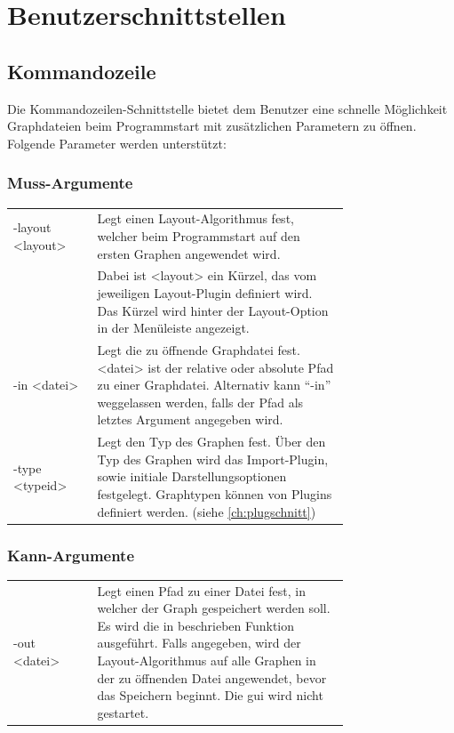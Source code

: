 \chapter{Benutzerschnittstellen}

\section{Kommandozeile}\label{sec:uicmd}

Die Kommandozeilen-Schnittstelle bietet dem Benutzer eine schnelle Möglichkeit Graphdateien beim Programmstart mit zusätzlichen Parametern zu öffnen.
Folgende Parameter werden unterstützt:\\
\subsection{Muss-Argumente}
\begin{tabular}{lp{0.75\linewidth}}
  -layout <layout> & Legt einen Layout-Algorithmus fest, welcher beim Programmstart auf den ersten Graphen angewendet wird.\\
    & Dabei ist <layout> ein Kürzel, das vom jeweiligen Layout-Plugin definiert wird. Das Kürzel wird hinter der Layout-Option in der Menüleiste angezeigt.\\
  -in <datei> & Legt die zu öffnende Graphdatei fest. <datei> ist der relative oder absolute Pfad zu einer Graphdatei. Alternativ kann ``-in'' weggelassen werden, falls der Pfad als letztes Argument angegeben wird.\\
  -type <typeid> & Legt den Typ des Graphen fest. Über den Typ des Graphen wird das Import-Plugin, sowie initiale Darstellungsoptionen festgelegt. Graphtypen können von Plugins definiert werden. (siehe \autoref{ch:plugschnitt})
\end{tabular}

\subsection{Kann-Argumente}
\begin{tabular}{lp{0.75\linewidth}}
  -out <datei> & Legt einen Pfad zu einer Datei fest, in welcher der Graph gespeichert werden soll.
  Es wird die in %
  beschrieben Funktion ausgeführt.
  Falls angegeben, wird der Layout-Algorithmus auf alle Graphen in der zu öffnenden Datei angewendet, bevor das Speichern beginnt.
  Die \gls{gui} wird nicht gestartet.
\end{tabular}

